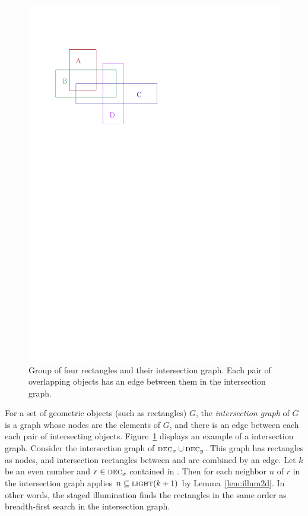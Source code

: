 \documentclass[english,gradu]{tktltiki2018}
\begin{document}
\begin{figure}
	\includegraphics[scale=0.7,page=2]{fig/inter}
	\caption{Group of four rectangles and their intersection graph. Each pair of overlapping objects has an edge between them in the intersection graph.}\label{fig:inter}
\end{figure}

For a set of geometric objects (such as rectangles) $G$, the \emph{intersection graph} of $G$ is a graph whose nodes are the elements of $G$, and there is an edge between each each pair of intersecting objects.
Figure~\ref{fig:inter} displays an example of a intersection graph.
Consider the intersection graph of $\textsc{dec}_{x}\cup\textsc{dec}_{y}$.
This graph has rectangles as nodes, and intersection rectangles between  and  are combined by an edge.
Let $k$ be an even number and $r\in\textsc{dec}_{x}$ contained in .
Then for each neighbor $n$ of $r$ in the intersection graph applies $n\subseteq\textsc{light}(k+1)$ by Lemma~\ref{lem:illum2d}.
In other words, the staged illumination finds the rectangles in the same order as breadth-first search in the intersection graph.
\end{document}
